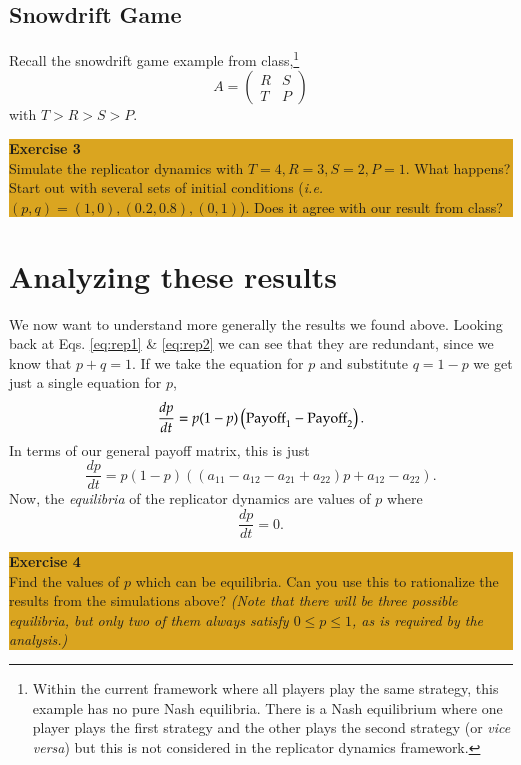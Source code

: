 \documentclass[12pt]{amsart}
\begin{document}
\subsection{Snowdrift Game}
\noindent Recall the snowdrift game example from class,\footnote{Within the current framework where all players
play the same strategy, this example has no pure Nash equilibria. There is a
Nash equilibrium where one player plays the first strategy and the other plays
the second strategy (or \textit{vice versa}) but this is not considered in the
replicator dynamics framework.}
\[
A=\left(
\begin{array}{cc}
R& S \\
T& P
\end{array}
\right)
\]
with $T > R > S > P$.  

\bigskip
\begin{center}
\colorbox{Goldenrod}{\parbox{15cm}{
{
\textbf{\large Exercise 3}\vspace{1mm} \\
Simulate the replicator dynamics with $T = 4, R = 3, S = 2, P = 1.$  What happens? Start out with several
sets of initial conditions ({\it i.e.} $(p,q)=(1,0), (0.2,0.8), (0,1)$). Does
it agree with our result from class?}}}
\end{center}


\section{Analyzing these results}
\noindent We now want to understand more generally the results we found above. Looking
back at Eqs. \ref{eq:rep1} \& \ref{eq:rep2} we can see that they are redundant,
since we know that $p+q=1$. If we take the equation for $p$ and substitute
$q=1-p$ we get just a single equation for $p$,
 \begin{equation}
   \frac{dp}{dt}= p (1-p) \left( {\rm Payoff}_1-{\rm Payoff}_2\right). \label{eq:rep_sing1}
\end{equation}
In terms of our general payoff matrix, this is just
 \begin{equation}
   \frac{dp}{dt}= p (1-p) \left( (a_{11}-a_{12}-a_{21}+a_{22})p+a_{12}-a_{22}\right). \label{eq:rep_sing2}
\end{equation}
Now, the {\it equilibria} of the replicator dynamics are values of $p$ where
$$\frac{dp}{dt}=0.$$


\bigskip
\begin{center}
\colorbox{Goldenrod}{\parbox{15cm}{
{
\textbf{\large Exercise 4}\vspace{1mm} \\
Find the values of $p$ which can be equilibria.  Can you use this to
rationalize the results from the simulations above? {\it (Note that there will
be three possible equilibria, but only two of them always satisfy $0\le p\le
1$, as is required by the analysis.)}}}}
\end{center}
\end{document}
